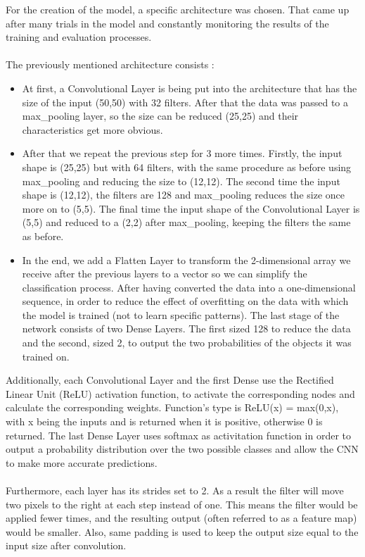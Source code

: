 For the creation of the model, a specific architecture was chosen. That came up after many trials in the model and constantly monitoring the results of the training and evaluation processes.\\~\\
The previously mentioned architecture consists : 
\begin{itemize}
  \item At first, a Convolutional Layer is being put into the architecture that has the size of the input (50,50) with 32 filters. After that the data was passed to a max\_pooling layer, so the size can be reduced (25,25) and their characteristics get more obvious.
  \item After that we repeat the previous step for 3 more times. Firstly, the input shape is (25,25) but with 64 filters, with the same procedure as before using max\_pooling and reducing the size to (12,12). The second time the input shape is (12,12), the filters are 128 and max\_pooling reduces the size once more on to (5,5). The final time the input shape of the Convolutional Layer is (5,5) and reduced to a (2,2) after max\_pooling, keeping the filters the same as before.
  \item In the end, we add a Flatten Layer to transform the 2-dimensional array we receive after the previous layers to a vector so we can simplify the classification process. After having converted the data into a one-dimensional sequence, in order to reduce the effect of overfitting on the data with which the model is trained (not to learn specific patterns). The last stage of the network consists of two Dense Layers. The first sized 128 to reduce the data and the second, sized 2, to output the two probabilities of the objects it was trained on.
\end{itemize}
Additionally, each Convolutional Layer and the first Dense use the Rectified Linear Unit (ReLU) activation function, to activate the corresponding nodes and calculate the corresponding weights. Function's type is ReLU(x) = max(0,x), with x being the inputs and is returned when it is positive, otherwise 0 is returned. The last Dense Layer uses softmax as activitation function in order to output a probability distribution over the two possible classes and allow the CNN to make more accurate predictions.\\~\\
Furthermore, each layer has its strides set to 2. As a result the filter will move two pixels to the right at each step instead of one. This means the filter would be applied fewer times, and the resulting output (often referred to as a feature map) would be smaller. Also, same padding is used to keep the output size equal to the input size after convolution.\\~\\
